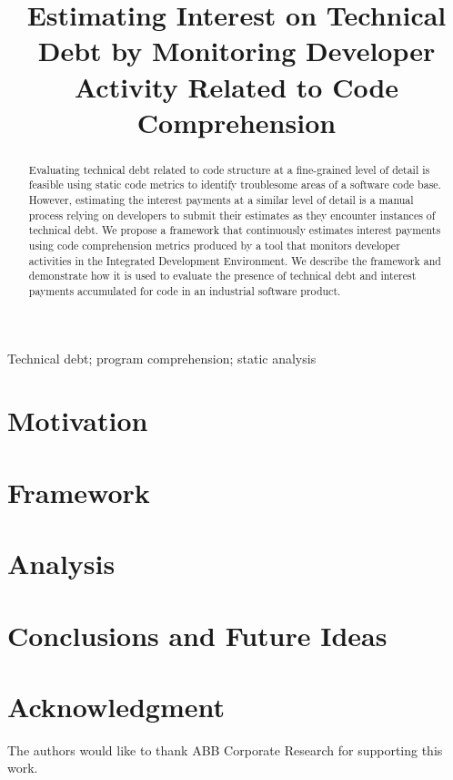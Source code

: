 \documentclass[conference]{IEEEtran}
\begin{document}
\title{Estimating Interest on Technical Debt by Monitoring Developer Activity Related to Code Comprehension}

\author{
\and
{}
}

\maketitle

\begin{abstract}
Evaluating technical debt related to code structure at a fine-grained level of detail is feasible using static code metrics to identify troublesome areas of a software code base.  However, estimating the interest payments at a similar level of detail is a manual process relying on developers to submit their estimates as they encounter instances of technical debt.  We propose a framework that continuously estimates interest payments using code comprehension metrics produced by a tool that monitors developer activities in the Integrated Development Environment.  We describe the framework and demonstrate how it is used to evaluate the presence of technical debt and interest payments accumulated for code in an industrial software product.
\end{abstract}

\begin{IEEEkeywords}
Technical debt; program comprehension; static analysis
\end{IEEEkeywords}

\section{Motivation}


\section{Framework}

\label{sec:DataFramework}
%

\section{Analysis}
\label{sec:AnalysisResults}


\section{Conclusions and Future Ideas}


\section*{Acknowledgment}
The authors would like to thank ABB Corporate Research for supporting this work.



\end{document}
